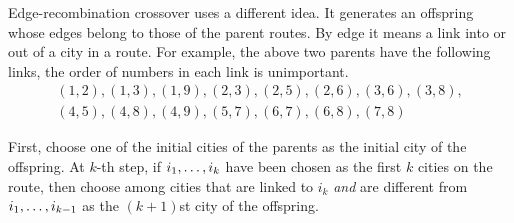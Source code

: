 \begin{frame}
  Edge-recombination crossover uses a different idea.  It generates an
  offspring whose edges belong to those of the parent routes.  By edge
  it means a link into or out of a city in a route.  For example,
  the above two parents have the following links, the order of numbers
  in each link is unimportant.
  \begin{gather*}
    (1, 2), (1, 3), (1, 9),
    (2, 3), (2, 5), (2,6), (3, 6), (3, 8), \\
    (4, 5), (4, 8), (4, 9), (5, 7), (6,7),(6,8), (7,8)
  \end{gather*}

  First, choose one of the initial cities of the parents as the initial
  city of the offspring.  At $k$-th step, if ${i}_1, \ldots, {i}_{k}$ have been
  chosen as the first $k$ cities on the route, then choose among
  cities that are linked to $i_k$ \emph{and\/} are different from
  ${i}_1, \ldots, {i}_{k-1}$ as the $(k+1)$st city of the offspring.
\end{frame}
